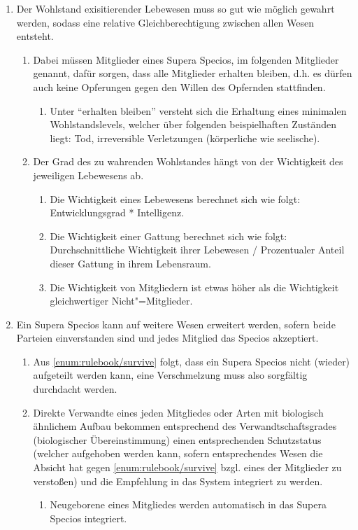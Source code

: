 \begin{enumerate}
  \item Der Wohlstand exisitierender Lebewesen muss so gut wie möglich gewahrt werden, sodass eine relative Gleichberechtigung zwischen allen Wesen entsteht.
  \begin{enumerate}
    \item Dabei müssen Mitglieder eines Supera Specios, im folgenden Mitglieder genannt, dafür sorgen, dass alle Mitglieder erhalten bleiben, d.h. es dürfen auch keine Opferungen gegen den Willen des Opfernden stattfinden.\label{enum:rulebook/survive}
    \begin{enumerate}
      \item Unter "`erhalten bleiben"' versteht sich die Erhaltung eines minimalen Wohlstandslevels, welcher über folgenden beispielhaften Zuständen liegt: Tod, irreversible Verletzungen (körperliche wie seelische).
    \end{enumerate}
    \item Der Grad des zu wahrenden Wohlstandes hängt von der Wichtigkeit des jeweiligen Lebewesens ab.
    \begin{enumerate}
      \item Die Wichtigkeit eines Lebewesens berechnet sich wie folgt: Entwicklungsgrad * Intelligenz.
      \item Die Wichtigkeit einer Gattung berechnet sich wie folgt: Durchschnittliche Wichtigkeit ihrer Lebewesen / Prozentualer Anteil dieser Gattung in ihrem Lebensraum.
      \item Die Wichtigkeit von Mitgliedern ist etwas höher als die Wichtigkeit gleichwertiger Nicht"=Mitglieder.
    \end{enumerate}
  \end{enumerate}
  \item Ein Supera Specios kann auf weitere Wesen erweitert werden, sofern beide Parteien einverstanden sind und jedes Mitglied das Specios akzeptiert.
  \begin{enumerate}
    \item Aus \vref{enum:rulebook/survive} folgt, dass ein Supera Specios nicht (wieder) aufgeteilt werden kann, eine Verschmelzung muss also sorgfältig durchdacht werden.
    \item Direkte Verwandte eines jeden Mitgliedes oder Arten mit biologisch ähnlichem Aufbau bekommen entsprechend des Verwandtschaftsgrades (biologischer Übereinstimmung) einen entsprechenden Schutzstatus (welcher aufgehoben werden kann, sofern entsprechendes Wesen die Absicht hat gegen \vref{enum:rulebook/survive} bzgl. eines der Mitglieder zu verstoßen) und die Empfehlung in das System integriert zu werden.
    \begin{enumerate}
      \item Neugeborene eines Mitgliedes werden automatisch in das Supera Specios integriert.
    \end{enumerate}
  \end{enumerate}
\end{enumerate}
